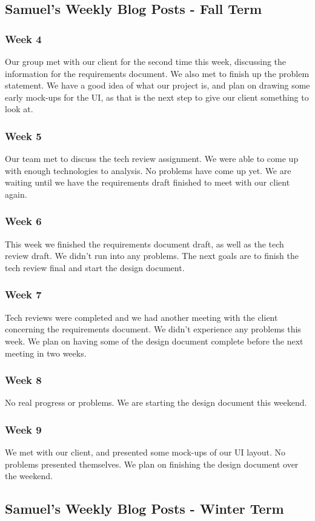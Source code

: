 \subsection{Samuel's Weekly Blog Posts - Fall Term}
\subsubsection{Week 4}
Our group met with our client for the second time this week, discussing the information for the requirements document. We also met to finish up the problem statement. We have a good idea of what our project is, and plan on drawing some early mock-ups for the UI, as that is the next step to give our client something to look at.
\subsubsection{Week 5}
Our team met to discuss the tech review assignment. We were able to come up with enough technologies to analysis. No problems have come up yet. We are waiting until we have the requirements draft finished to meet with our client again.
\subsubsection{Week 6}
This week we finished the requirements document draft, as well as the tech review draft. We didn't run into any problems. The next goals are to finish the tech review final and start the design document.
\subsubsection{Week 7}
Tech reviews were completed and we had another meeting with the client concerning the requirements document. We didn't experience any problems this week. We plan on having some of the design document complete before the next meeting in two weeks.
\subsubsection{Week 8}
No real progress or problems. We are starting the design document this weekend.
\subsubsection{Week 9}
We met with our client, and presented some mock-ups of our UI layout. No problems presented themselves. We plan on finishing the design document over the weekend.
\subsection{Samuel's Weekly Blog Posts - Winter Term}
